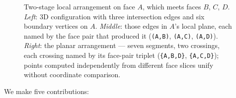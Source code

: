 \documentclass{egpubl}
\begin{document}
\begin{figure}[t]
  \centering
  
  \caption{Two-stage local arrangement on face $A$, which meets faces $B$, $C$, $D$. \emph{Left}: 3D configuration with three intersection edges and six boundary vertices on $A$. \emph{Middle}: those edges in $A$'s local plane, each named by the face pair that produced it (\texttt{(A,B)}, \texttt{(A,C)}, \texttt{(A,D)}). \emph{Right}: the planar arrangement --- seven segments, two crossings, each crossing named by its face-pair triplet (\texttt{\{A,B,D\}}, \texttt{\{A,C,D\}}); points computed independently from different face slices unify without coordinate comparison.}
  \label{fig:arrangement_pipeline}
\end{figure}

We make five contributions:
\end{document}
